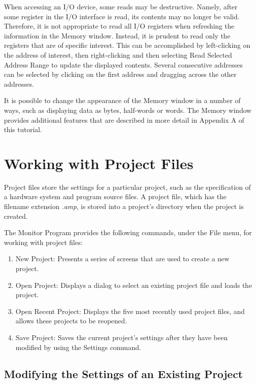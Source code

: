 \documentclass[11pt, twoside, pdftex]{article}
\begin{document}
When accessing an I/O device, some reads may be destructive.
Namely, after some register in the I/O interface is read, its
contents may no longer be valid. Therefore, it is not
appropriate to read all I/O registers when refreshing the
information in the Memory window. Instead, it is prudent to read
only the registers that are of specific interest. This can be
accomplished  by left-clicking on the address of interest,
then right-clicking and then selecting {\sf Read Selected Address Range}
to update the displayed contents. Several consecutive addresses
can be selected by clicking on the first address and dragging
across the other addresses. 

It is possible to change the appearance of the Memory window in a
number of ways, such as displaying data as bytes, half-words or
words. 
The Memory window provides additional features that are described
in more detail in Appendix A of this tutorial.

\section{Working with Project Files}
\label{sec:4}

Project files store the settings for a particular project, 
such as the specification of a hardware system and program source
files. A project file, which has the filename 
extension {\it .amp}, is stored into a project's directory when
the project is created. 

The Monitor Program provides the following commands, under the
{\sf File} menu, for working with project files:

\begin{enumerate}
    \item {\sf New Project}: Presents a series of screens that are used to create a new project.
    \item {\sf Open Project}: Displays a dialog to select an
existing project file and loads the project.
    \item {\sf Open Recent Project}:  Displays the five most recently used project files, and allows these projects to be
reopened.
    \item {\sf Save Project}: Saves the current project's
settings after they have been modified by using 
the {\sf Settings} command.
\end{enumerate}

\subsection{Modifying the Settings of an Existing Project}
\label{sec:4.1}
\end{document}
